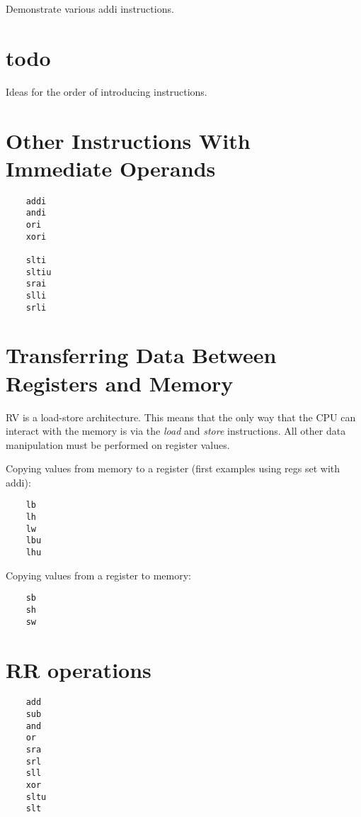 Demonstrate various addi instructions. 


\section{todo}

Ideas for the order of introducing instructions.


\section{Other Instructions With Immediate Operands}

\label{insn:andi}
\label{insn:ori}
\label{insn:xori}
\label{insn:slti}
\label{insn:sltiu}
\label{insn:srai}
\label{insn:slli}
\label{insn:srli}
\begin{verbatim}
    addi
    andi
    ori
    xori

    slti
    sltiu
    srai
    slli
    srli
\end{verbatim}


\section{Transferring Data Between Registers and Memory}

RV is a load-store architecture.  This means that the only way that the
CPU can interact with the memory is via the {\em load} and {\em store}
instructions.  All other data manipulation must be performed on register
values.

Copying values from memory to a register (first examples using regs set with addi):
\label{insn:lb}
\label{insn:lh}
\label{insn:lw}
\label{insn:lbu}
\label{insn:lhu}
\begin{verbatim}
    lb
    lh
    lw
    lbu
    lhu
\end{verbatim}

Copying values from a register to memory:
\label{insn:sb}
\label{insn:sh}
\label{insn:sw}
\begin{verbatim}
    sb
    sh
    sw
\end{verbatim}


\section{RR operations}
\label{insn:add}
\label{insn:sub}
\label{insn:and}
\label{insn:or}
\label{insn:sra}
\label{insn:srl}
\label{insn:sll}
\label{insn:xor}
\label{insn:sltu}
\label{insn:slt}
\begin{verbatim}
    add
    sub
    and
    or
    sra
    srl
    sll
    xor
    sltu
    slt
\end{verbatim}


